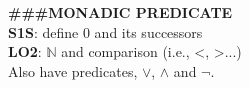 \documentclass{article}
\begin{document}
\begin{multicols}{4}
\textbf{\#\#\#MONADIC PREDICATE} \\
\textbf{S1S}: define 0 and its successors \\
\textbf{LO2}: $\mathbb{N}$ and comparison (i.e., <, >...) \\
Also have predicates, $\vee$, $\wedge$ and $\neg$. \\




\end{multicols}
\end{document}
